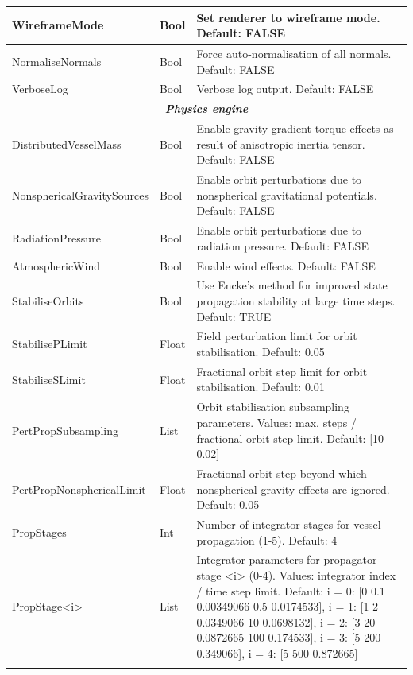 \documentclass[Orbiter User Manual.tex]{subfiles}
\begin{document}
\begin{longtable}{ |p{}|p{}|p{}| }
	WireframeMode & Bool & Set renderer to wireframe mode. Default: FALSE\\
	\hline\rule{0pt}{2ex}
	NormaliseNormals & Bool & Force auto-normalisation of all normals. Default: FALSE\\
	\hline\rule{0pt}{2ex}
	VerboseLog & Bool & Verbose log output. Default: FALSE\\
	\hline
	\multicolumn{3}{|c|}{\rule{0pt}{2ex}\textbf{\textit{Physics engine}}}\\
	\hline\rule{0pt}{2ex}
	DistributedVesselMass & Bool & Enable gravity gradient torque effects as result of anisotropic inertia tensor. Default: FALSE\\
	\hline\rule{0pt}{2ex}
	NonsphericalGravitySources & Bool & Enable orbit perturbations due to nonspherical gravitational potentials. Default: FALSE\\
	\hline\rule{0pt}{2ex}
	RadiationPressure & Bool & Enable orbit perturbations due to radiation pressure. Default: FALSE\\
	\hline\rule{0pt}{2ex}
	AtmosphericWind & Bool & Enable wind effects. Default: FALSE\\
	\hline\rule{0pt}{2ex}
	StabiliseOrbits & Bool & Use Encke's method for improved state propagation stability at large time steps. Default: TRUE\\
	\hline\rule{0pt}{2ex}
	StabilisePLimit & Float & Field perturbation limit for orbit stabilisation. Default: 0.05\\
	\hline\rule{0pt}{2ex}
	StabiliseSLimit & Float & Fractional orbit step limit for orbit stabilisation. Default: 0.01\\
	\hline\rule{0pt}{2ex}
	PertPropSubsampling & List & Orbit stabilisation subsampling parameters. Values: max. steps / fractional orbit step limit. Default: [10 0.02]\\
	\hline\rule{0pt}{2ex}
	PertPropNonsphericalLimit & Float & Fractional orbit step beyond which nonspherical gravity effects are ignored. Default: 0.05\\
	\hline\rule{0pt}{2ex}
	PropStages & Int & Number of integrator stages for vessel propagation (1-5). Default: 4\\
	\hline\rule{0pt}{2ex}
	PropStage<i> & List & Integrator parameters for propagator stage <i> (0-4). Values: integrator index / time step limit. Default: i = 0: [0 0.1 0.00349066 0.5 0.0174533], i = 1: [1 2 0.0349066 10 0.0698132], i = 2: [3 20 0.0872665 100 0.174533], i = 3: [5 200 0.349066], i = 4: [5 500 0.872665]\\
	\hline\rule{0pt}{2ex}

\end{longtable}
\end{document}
